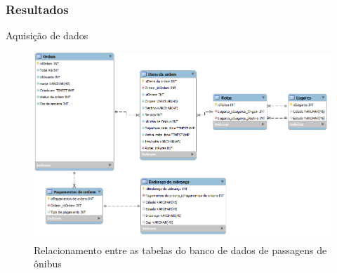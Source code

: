 \begin{frame}
\frametitle{Resultados}
Aquisição de dados

\begin{center}
\begin{figure}[ht]
    \includegraphics[width=1\textwidth]{../img/estrutura-banco-de-dados}
    \caption{Relacionamento entre as tabelas do banco de dados de passagens de ônibus}
    \label{fig:bd-clickbus}
\end{figure}
\end{center}
\end{frame}